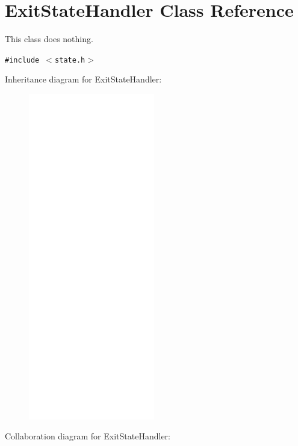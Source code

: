 \hypertarget{classExitStateHandler}{
\section{ExitStateHandler Class Reference}
\label{classExitStateHandler}
}
This class does nothing.  


{\tt \#include $<$state.h$>$}

Inheritance diagram for ExitStateHandler:\nopagebreak
\begin{figure}[H]
\begin{center}
\leavevmode
\includegraphics[width=156pt]{classExitStateHandler__inherit__graph}
\end{center}
\end{figure}
Collaboration diagram for ExitStateHandler:\nopagebreak
